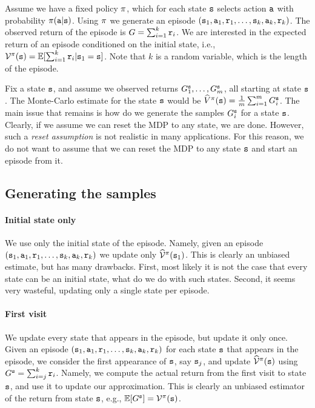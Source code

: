 Assume we have a fixed policy $\pi$, which for each state
${\tt s}$ selects action ${\tt a}$ with probability
$\pi({\tt a}|{\tt s})$. Using $\pi$ we generate an episode
$({\tt s}_1, {\tt a}_1, {\tt r}_1, \ldots ,
{\tt s}_k,{\tt a}_k,{\tt r}_k)$. The observed return of the episode
is $G=\sum_{i=1}^k {\tt r}_i$. We are interested in the expected
return of an episode conditioned on the initial state, i.e.,
$\mathcal{V}^\pi({\tt s})=\mathbb{E}[\sum_{i=1}^k {\tt r}_i |{\tt s}_1={\tt s}]$.
Note that $k$ is a random variable, which is the length of the
episode.

Fix a state ${\tt s}$, and assume we observed returns $G^{\tt s}_1,
\ldots , G^{\tt s}_m$, all starting at state ${\tt s}$. The
Monte-Carlo estimate for the state ${\tt s}$ would be
$\widehat{V}^\pi({\tt s})=\frac{1}{m}\sum_{i=1}^m G_i^{\tt s}$. The main
issue that remains is how do we generate the samples $G^{\tt s}_i$
for a state ${\tt s}$. Clearly, if we assume we can reset the MDP to
any state, we are done. However, such a \emph{reset assumption} is
not realistic in many applications. For this reason, we do not want
to assume that we can reset the MDP to any state ${\tt s}$ and start
an episode from it.

\subsection{Generating the samples}

\paragraph{Initial state only}
We use only the initial state of the episode. Namely, given an
episode $({\tt s}_1, {\tt a}_1, {\tt r}_1, \ldots ,
{\tt s}_k,{\tt a}_k,{\tt r}_k)$ we update only
$\widehat{\mathcal{V}}^\pi({\tt s}_1)$. This is clearly an unbiased
estimate, but has many drawbacks. First, most likely it is not the
case that every state can be an initial state, what do we do with
such states. Second, it seems very wasteful, updating only a single
state per episode.

\paragraph{First visit}
We update every state that appears in the episode, but update it
only once. Given an episode $({\tt s}_1, {\tt a}_1, {\tt r}_1, \ldots
, {\tt s}_k,{\tt a}_k,{\tt r}_k)$ for each state ${\tt s}$ that appears
in the episode, we consider the first appearance of ${\tt s}$, say
${\tt s}_j$, and update $\widehat{\mathcal{V}}^\pi({\tt s})$ using
$G^{\tt s}=\sum_{i=j}^k {\tt r}_i$. Namely, we compute the actual
return from the first visit to state ${\tt s}$, and use it to update
our approximation. This is clearly an unbiased estimator of the
return from state ${\tt s}$, e.g.,
$\mathbb{E}[G^{\tt s}]=\mathcal{V}^\pi({\tt s})$.

